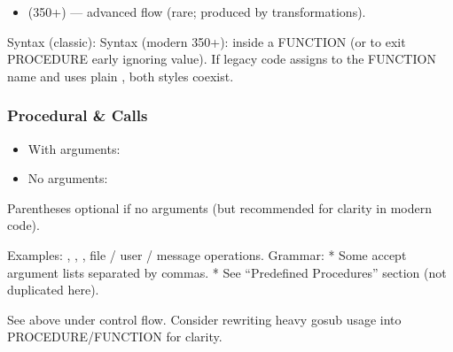 \documentclass[letterpaper,10pt,english]{sphinxmanual}
\begin{document}
\begin{description}
\begin{description}
\begin{itemize}
\item {} 
\sphinxAtStartPar
{} (350+) — advanced flow (rare; produced by transformations).

\end{itemize}

\end{description}

\sphinxAtStartPar
Syntax (classic): 
Syntax (modern 350+):  inside a FUNCTION (or to exit PROCEDURE early ignoring value).
If legacy code assigns to the FUNCTION name and uses plain , both styles coexist.

\end{description}


\subsubsection{Procedural \& Calls}
\label{\detokenize{ppl:procedural-calls}}\begin{description}
\begin{description}
\begin{itemize}
\item {} 
\sphinxAtStartPar
With arguments: 

\item {} 
\sphinxAtStartPar
No arguments: 

\end{itemize}

\end{description}

\sphinxAtStartPar
Parentheses optional if no arguments (but recommended for clarity in modern code).

\sphinxAtStartPar
Examples: , , , file / user / message operations.
Grammar:
* Some accept argument lists separated by commas.
* See “Predefined Procedures” section (not duplicated here).

\sphinxAtStartPar
See above under control flow. Consider rewriting heavy gosub usage into PROCEDURE/FUNCTION for clarity.

\end{description}
\end{document}
